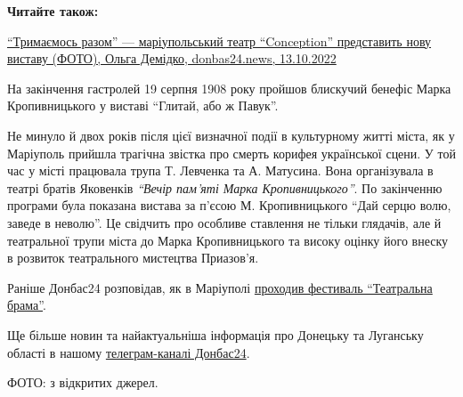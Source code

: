 \textbf{Читайте також:} 

\href{https://donbas24.news/news/trimajemos-razom-mariupolskii-teatr-conception-predstavit-novu-vistavu-foto}{%
\enquote{Тримаємось разом} — маріупольський театр \enquote{Conception} представить нову виставу (ФОТО), Ольга Демідко, donbas24.news, 13.10.2022}


На закінчення гастролей 19 серпня 1908 року пройшов блискучий бенефіс Марка
Кропивницького у виставі \enquote{Глитай, або ж Павук}.

Не минуло й двох років після цієї визначної події в культурному житті міста, як
у Маріуполь прийшла трагічна звістка про смерть корифея української сцени. У
той час у місті працювала трупа Т. Левченка та А. Матусина. Вона організувала в
театрі братів Яковенків \emph{\enquote{Вечір пам'яті Марка Кропивницького}}. По закінченню
програми була показана вистава за п'єсою М. Кропивницького \enquote{Дай серцю волю,
заведе в неволю}. Це свідчить про особливе ставлення не тільки глядачів, але й
театральної трупи міста до Марка Кропивницького та високу оцінку його внеску в
розвиток театрального мистецтва Приазов’я.

Раніше Донбас24 розповідав, як в Маріуполі
\href{https://donbas24.news/news/yak-v-mariupoli-proxodiv-festival-teatralna-brama-detali}{проходив
фестиваль \enquote{Театральна брама}}.

Ще більше новин та найактуальніша інформація про Донецьку та Луганську області
в нашому \href{https://t.me/donbas24}{телеграм-каналі Донбас24}.

ФОТО: з відкритих джерел.


